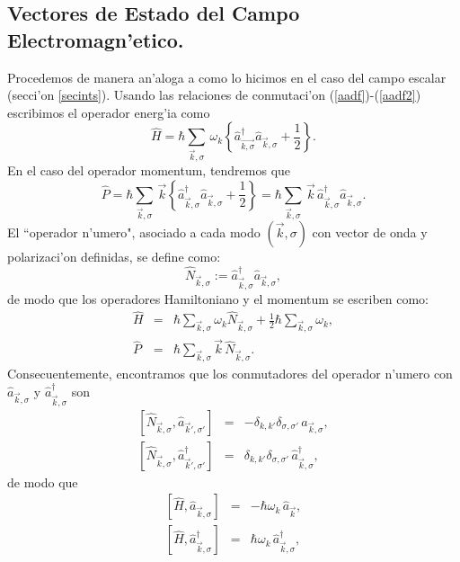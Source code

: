 \subsection{Vectores de Estado del Campo Electromagn'etico.}

Procedemos de manera an'aloga a como lo hicimos en el caso del campo escalar
(secci'on \ref{secints}). Usando las relaciones de conmutaci'on
(\ref{aadf})-(\ref{aadf2}) escribimos el operador energ'ia como
\begin{equation}
\hat{H}  = \hbar\sum_{\vec{k},\sigma}\,\omega_{k}\left\{
\hat{a}_{\vec{k,\sigma}}^{\dagger} \hat{a}_{\vec{k},\sigma} +\frac{1}{2}
\right\}.
\end{equation} 
En el caso del operador momentum, tendremos que
\begin{equation}
\hat{P}  = \hbar\sum_{\vec{k},\sigma}\, \vec{k}\left\{
\hat{a}_{\vec{k},\sigma}^{\dagger} \hat{a}_{\vec{k},\sigma} +\frac{1}{2}
\right\}=\hbar\sum_{\vec{k},\sigma}\,
\vec{k}\,\hat{a}_{\vec{k},\sigma}^{\dagger}\hat{a}_{\vec{k},\sigma}.
\end{equation} 
El ``operador n'umero", asociado a cada modo $(\vec{k},\sigma)$ con vector de
onda y polarizaci'on definidas, se define como:
\begin{equation}
\hat{N}_{\vec{k},\sigma}:=\hat{a}_{\vec{k},\sigma}^{\dagger}\hat{a}_{\vec{k},
\sigma} ,\label{defNa}
\end{equation}
de modo que los operadores Hamiltoniano y el momentum se escriben como:%
\begin{eqnarray}
\hat{H} & = &\hbar\sum_{\vec{k},\sigma}
\omega_{k}\hat{N}_{\vec{k},\sigma}+\frac{1}{2}\hbar\sum_{\vec{k},\sigma}
\omega_{k}  ,\\
\hat{P} & = &\hbar\sum_{\vec{k},\sigma} \vec{k}\,\hat{N}_{\vec{k},\sigma} .
\end{eqnarray}
Consecuentemente, encontramos que los conmutadores del operador n'umero con
$\hat{a}_{\vec{k},\sigma}$ y $\hat{a}_{\vec{k},\sigma}^{\dagger}$ son
\begin{eqnarray}
\left[ \hat{N}_{\vec{k},\sigma},\hat{a}_{\vec{k}',\sigma'}\right]
&=&-\delta_{k,k'}\delta_{\sigma,\sigma'}\,\hat{a}_{\vec{k},\sigma}, \\
\left[ \hat{N}_{\vec{k},\sigma},\hat{a}^{\dagger}_{\vec{k}',\sigma'}\right]
&=&\delta_{k,k'}\delta_{\sigma,\sigma'}\,\hat{a}^{\dagger}_{\vec{k},\sigma},
\end{eqnarray} 
de modo que
\begin{eqnarray}
\left[ \hat{H},\hat{a}_{\vec{k},\sigma}\right] &=&-\hbar\omega_k\,
\hat{a}_{\vec{k}}, \label{comha}\\
\left[ \hat{H},\hat{a}^{\dagger}_{\vec{k},\sigma}\right]
&=&\hbar\omega_k\,\hat{a}^{\dagger}_{\vec{k},\sigma},
\end{eqnarray} 

